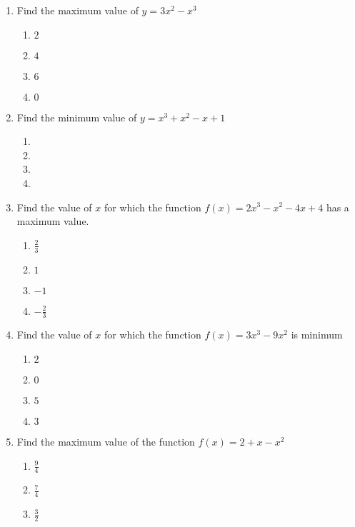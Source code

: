 \begin{enumerate}[label={\arabic*.}]
\begin{enumerate}[label={\Alph*.}]
            \item 
        \end{enumerate}
  \item Find the maximum value of \(y = 3x^2 - x^3\)
        \begin{enumerate}[label={\Alph*.}]
            \item \(2\)
            \item \(4\)
            \item \(6\)
            \item \(0\)
        \end{enumerate}
  \item Find the minimum value of \(y = x^3 + x^2 - x + 1\)
        \begin{enumerate}[label={\Alph*.}]
            \item 
            \item 
            \item 
            \item 
        \end{enumerate}
  \item Find the value of \(x\) for which the function \(f(x) = 2x^3 - x^2 -4x + 4\) has a maximum value.
        \begin{enumerate}[label={\Alph*.}]
            \item \(\frac{2}{3}\)
            \item \(1\)
            \item \(-1\)
            \item \(-\frac{2}{3}\)
        \end{enumerate}
  \item Find the value of \(x\) for which the function \(f(x) = 3x^3-9x^2\) is minimum
        \begin{enumerate}[label={\Alph*.}]
            \item \(2\)
            \item \(0\)
            \item \(5\)
            \item \(3\)
        \end{enumerate}
  \item Find the maximum value of the function \(f(x) = 2 + x - x^2\)
        \begin{enumerate}[label={\Alph*.}]
            \item \(\frac{9}{4}\)
            \item \(\frac{7}{4}\)
            \item \(\frac{3}{2}\)

\end{enumerate}
\end{enumerate}
